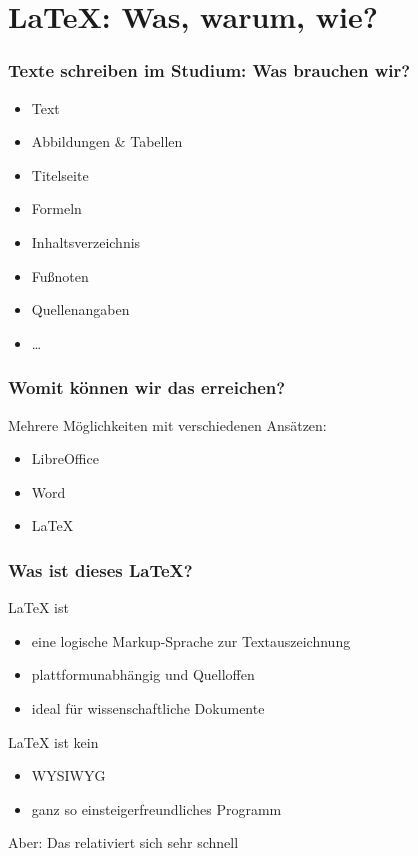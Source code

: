 \section{\LaTeX{}: Was, warum, wie?}

\begin{frame}
    \frametitle{Texte schreiben im Studium: Was brauchen wir?}
    \begin{itemize}
        \item Text
        \item Abbildungen \& Tabellen
        \item Titelseite
        \item Formeln
        \item Inhaltsverzeichnis
        \item Fußnoten
        \item Quellenangaben
        \item \ldots
    \end{itemize}
\end{frame}

\begin{frame}
    \frametitle{Womit können wir das erreichen?}
    \begin{block}{Mehrere Möglichkeiten mit verschiedenen Ansätzen:}
	    \begin{itemize}
	        \item LibreOffice
	        \item Word
	        \item \LaTeX
	    \end{itemize}
    \end{block}
\end{frame}

\begin{frame}
    \frametitle{Was ist dieses \LaTeX{}?}
    \LaTeX{} ist
    \begin{itemize}
        \item eine logische Markup-Sprache zur Textauszeichnung
        \item plattformunabhängig und Quelloffen
        \item ideal für wissenschaftliche Dokumente
    \end{itemize}
    \bigskip
    
    \LaTeX{} ist kein
    \begin{itemize}
        \item WYSIWYG
        \item ganz so einsteigerfreundliches Programm
    \end{itemize}
    \medskip
    
    Aber: Das relativiert sich sehr schnell
\end{frame}

